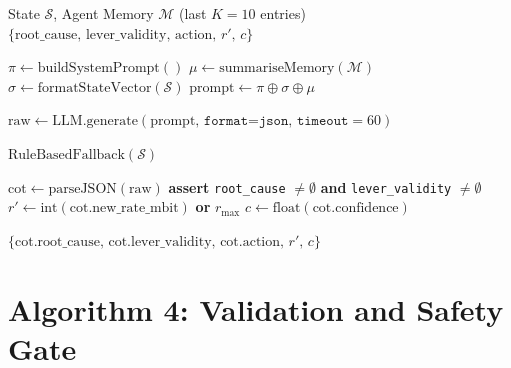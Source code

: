 \begin{algorithm}[H]
\caption{Planning Agent: CoT-Enforced Action Selection}
\label{alg:plan}
\begin{algorithmic}[1]
\Require State $\mathcal{S}$, Agent Memory $\mathcal{M}$ (last $K=10$ entries)
\Ensure $\{\text{root\_cause},\, \text{lever\_validity},\, \text{action},\, r',\, c\}$

\State $\pi \gets \text{buildSystemPrompt}()$ 
\State $\mu \gets \text{summariseMemory}(\mathcal{M})$ 
\State $\sigma \gets \text{formatStateVector}(\mathcal{S})$ 
\State $\text{prompt} \gets \pi \oplus \sigma \oplus \mu$

\State $\text{raw} \gets \text{LLM.generate}(\text{prompt},\, \texttt{format=json},\, \texttt{timeout}=60)$

 
  \Return $\text{RuleBasedFallback}(\mathcal{S})$ 
\EndIf

\State $\text{cot} \gets \text{parseJSON}(\text{raw})$
\State \textbf{assert} \texttt{root\_cause} $\neq \emptyset$ \textbf{ and } \texttt{lever\_validity} $\neq \emptyset$
\State $r' \gets \text{int}(\text{cot.new\_rate\_mbit})$ \textbf{ or } $r_{\max}$
\State $c \gets \text{float}(\text{cot.confidence})$

\Return $\{\text{cot.root\_cause},\, \text{cot.lever\_validity},\, \text{cot.action},\, r',\, c\}$
\end{algorithmic}
\end{algorithm}

\section{Algorithm 4: Validation and Safety Gate}


